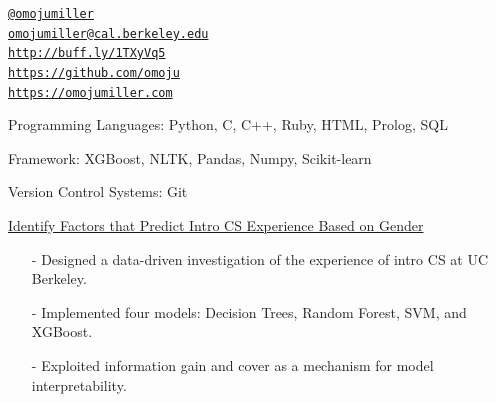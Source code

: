 \documentclass[11pt,article,oneside]{memoir}
\makeatletter
\def\myemail{omojumiller@cal.berkeley.edu}
\def\myweb{https://omojumiller.com}
\def\mytwitter{@omojumiller}
\def\mylinkedin{http://buff.ly/1TXyVq5}
\def\mygithub{https://github.com/omoju}
\makeatother
\begin{document}
\begin{minipage}[t]{2.95in}
  
\end{minipage}
\hfill     
\hfill
\begin{minipage}[t]{1.6in}
  \flushright \footnotesize  \addressblock 
  {\scriptsize  \texttt{\href{http://twitter.com/omojumiller}{\mytwitter}} \, \faTwitter }  \\ 
  {\scriptsize  \texttt{\href{mailto:\myemail}{\myemail}} \, \faEnvelope} \\
  {\scriptsize  \texttt{\href{\mylinkedin}{\mylinkedin}} \, \faLinkedin} \\
  {\scriptsize  \texttt{\href{\mygithub}{\mygithub}} \, \faGithub} \\
  {\scriptsize  \texttt{\href{\myweb}{\myweb}} \, \faGlobe}
\end{minipage}

\medskip

\reversemarginpar

\bigskip       

\medskip

\ind Programming Languages: Python, C, C++, Ruby, HTML, Prolog, SQL

\ind Framework: XGBoost, NLTK, Pandas, Numpy, Scikit-learn

\ind Version Control Systems: Git


\medskip

\ind \href{https://github.com/omoju/IntroCSExperiencePrediction}{Identify Factors that Predict Intro CS Experience Based on Gender}
\begin{itemize}[noitemsep,nolistsep]
\item[-] Designed a data-driven investigation of the experience of intro CS at UC Berkeley.
\item[-] Implemented four models: Decision Trees, Random Forest, SVM, and XGBoost.
\item[-] Exploited information gain and cover as a mechanism for model interpretability.
\end{itemize}
\end{document}

